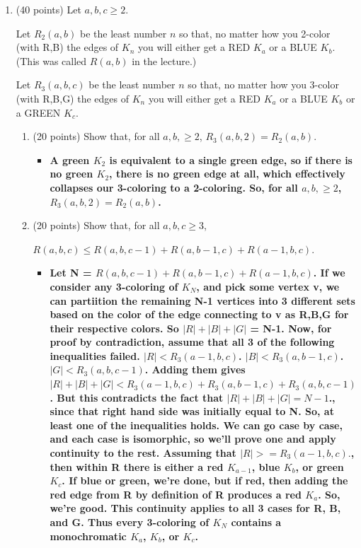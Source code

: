 \documentclass[12pt]{article}
\begin{document}
\begin{enumerate}
\begin{enumerate}
\item
(0 points) 
Which is bigger XXX or YYY? Is there an intuition for that? 
\end{enumerate}


\vfill 

\centerline{\bf GO TO THE NEXT PAGE}

\newpage

\item 
(40 points)
Let $a,b,c\ge 2$. 

Let $R_2(a,b)$ be the least number $n$ so that, no matter how you 2-color
(with R,B) the edges of $K_n$ you will either get a RED $K_a$ or a BLUE $K_b$.
(This was called $R(a,b)$ in the lecture.)


Let $R_3(a,b,c)$ be the least number $n$ so that, no matter how you 3-color
(with R,B,G) the edges of $K_n$ you will either get a RED $K_a$ or a BLUE $K_b$
or a GREEN $K_c$. 

\begin{enumerate}

\item
(20 points)
Show that, for all $a,b,\ge 2$, $R_3(a,b,2)=R_2(a,b)$.
\begin{itemize}
    \item \textbf{A green $K_2$ is equivalent to a single green edge, so if there is no green $K_2$, there is no green edge at all, which effectively collapses our 3-coloring to a 2-coloring. So, for all $a,b,\ge 2$, $R_3(a,b,2)=R_2(a,b)$.}
\end{itemize}

\item
(20 points)
Show that, for all $a,b,c\ge 3$, 

$R(a,b,c) \le R(a,b,c-1) + R(a,b-1,c) + R(a-1,b,c)$. 
\begin{itemize}
    \item \textbf{Let N = $R(a,b,c-1) + R(a,b-1,c) + R(a-1,b,c)$. If we consider any 3-coloring of $K_N$, and pick some vertex v, we can partiition the remaining N-1 vertices into 3 different sets based on the color of the edge connecting to v as R,B,G for their respective colors. So $|R| + |B| + |G|$ = N-1. Now, for proof by contradiction, assume that all 3 of the following inequalities failed. $|R| < R_3(a-1, b, c)$. $|B| < R_3(a, b-1, c)$. $|G| < R_3(a, b, c-1)$. Adding them gives $|R| + |B| + |G| < R_3(a-1, b, c) + R_3(a, b-1, c) + R_3(a, b, c-1)$. But this contradicts the fact that $|R| + |B| + |G| = N-1$., since that right hand side was initially equal to N. So, at least one of the inequalities holds. We can go case by case, and each case is isomorphic, so we'll prove one and apply continuity to the rest. Assuming that $|R| >=  R_3(a-1, b, c).$, then within R there is either a red $K_{a-1}$, blue $K_b$, or green $K_c$. If blue or green, we're done, but if red, then adding the red edge from R by definition of R produces a red $K_a$. So, we're good. This continuity applies to all 3 cases for R, B, and G. Thus every 3-coloring of $K_N$ contains a monochromatic $K_a$, $K_b$, or $K_c$.}
\end{itemize}


\end{enumerate}
\end{enumerate}
\end{document}
